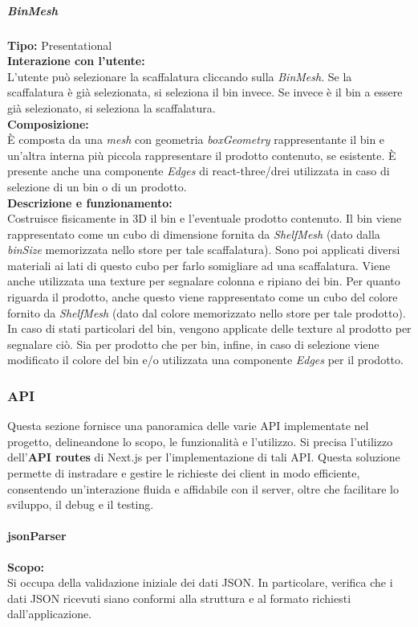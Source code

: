 \subparagraph{\colorbox{verde_uml}{BinMesh}}
\textbf{Tipo:} Presentational \\
\textbf{Interazione con l'utente:} \\
L'utente può selezionare la scaffalatura cliccando sulla \textit{BinMesh}. Se la scaffalatura è già selezionata, si seleziona il bin invece. Se invece è il bin a essere già selezionato, si seleziona la scaffalatura.\\
\textbf{Composizione:} \\
È composta da una \textit{mesh} con geometria \textit{boxGeometry} rappresentante il bin e un'altra interna più piccola rappresentare il prodotto contenuto, se esistente. È presente anche una componente \textit{Edges} di react-three/drei utilizzata in caso di selezione di un bin o di un prodotto.\\
\textbf{Descrizione e funzionamento:} \\
Costruisce fisicamente in 3D il bin e l'eventuale prodotto contenuto. Il bin viene rappresentato come un cubo di dimensione fornita da \textit{ShelfMesh} (dato dalla \textit{binSize} memorizzata nello store per tale scaffalatura). Sono poi applicati diversi materiali ai lati di questo cubo per farlo somigliare ad una scaffalatura. Viene anche utilizzata una texture per segnalare colonna e ripiano dei bin. Per quanto riguarda il prodotto, anche questo viene rappresentato come un cubo del colore fornito da \textit{ShelfMesh} (dato dal colore memorizzato nello store per tale prodotto). In caso di stati particolari del bin, vengono applicate delle texture al prodotto per segnalare ciò. Sia per prodotto che per bin, infine, in caso di selezione viene modificato il colore del bin e/o utilizzata una componente \textit{Edges} per il prodotto.

\subsubsection{API}
Questa sezione fornisce una panoramica delle varie API implementate nel progetto, delineandone lo scopo, le funzionalità e l'utilizzo. Si precisa l'utilizzo dell'\textbf{API routes} di Next.js per l'implementazione di tali API. Questa soluzione permette di instradare e gestire le richieste dei client in modo efficiente, consentendo un'interazione fluida e affidabile con il server, oltre che facilitare lo sviluppo, il debug e il testing.

\paragraph{jsonParser}
\textbf{Scopo:}\\
Si occupa della validazione iniziale dei dati JSON. In particolare, verifica che i dati JSON ricevuti siano conformi alla struttura e al formato richiesti dall'applicazione.

